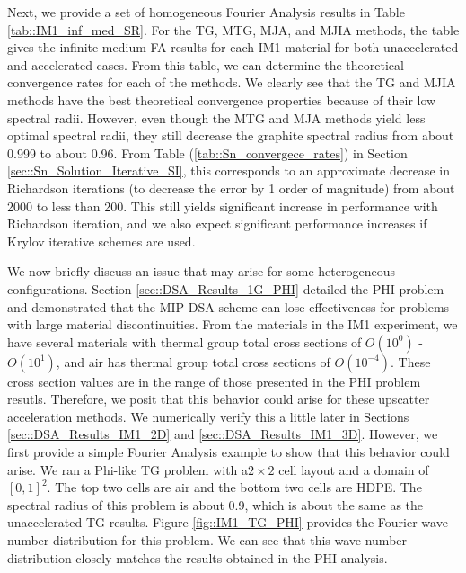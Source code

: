 Next, we provide a set of homogeneous Fourier Analysis results in Table \ref{tab::IM1_inf_med_SR}. For the TG, MTG, MJA, and MJIA methods, the table gives the infinite medium FA results for each IM1 material for both unaccelerated and accelerated cases. From this table, we can determine the theoretical convergence rates for each of the methods. We clearly see that the TG and MJIA methods have the best theoretical convergence properties because of their low spectral radii. However, even though the MTG and MJA methods yield less optimal spectral radii, they still decrease the graphite spectral radius from about 0.999 to about 0.96. From Table (\ref{tab::Sn_convergece_rates}) in Section \ref{sec::Sn_Solution_Iterative_SI},  this corresponds to an approximate decrease in Richardson iterations (to decrease the error by 1 order of magnitude) from about 2000 to less than 200. This still yields significant increase in performance with Richardson iteration, and we also expect significant performance increases if Krylov iterative schemes are used. 

We now briefly discuss an issue that may arise for some heterogeneous configurations. Section \ref{sec::DSA_Results_1G_PHI} detailed the PHI problem and demonstrated that the MIP DSA scheme can lose effectiveness for problems with large material discontinuities. From the materials in the IM1 experiment, we have several materials with thermal group total cross sections of $O(10^0)$ - $O(10^1)$, and air has thermal group total cross sections of $O(10^{-4})$. These cross section values are in the range of those presented in the PHI problem resutls. Therefore, we posit that this behavior could arise for these upscatter acceleration methods. We numerically verify this a little later in Sections \ref{sec::DSA_Results_IM1_2D} and \ref{sec::DSA_Results_IM1_3D}. However, we first provide a simple Fourier Analysis example to show that this behavior could arise. We ran a Phi-like TG problem with a$2 \times 2$ cell layout and a domain of $[0,1]^2$. The top two cells are air and the bottom two cells are HDPE. The spectral radius of this problem is about 0.9, which is about the same as the unaccelerated TG results. Figure \ref{fig::IM1_TG_PHI} provides the Fourier wave number distribution for this problem. We can see that this wave number distribution closely matches the results obtained in the PHI analysis.

